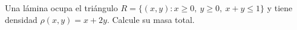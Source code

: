 Una lámina ocupa el triángulo $R=\{(x,y):x\geq0,\ y\geq0,\ x+y\leq1\}$ y tiene densidad $\rho(x,y)=x+2y$. Calcule su masa total.
